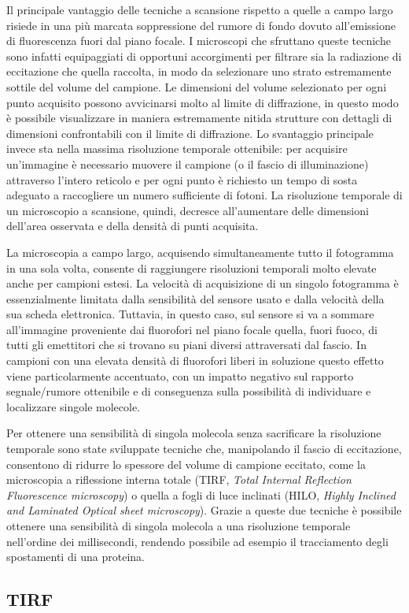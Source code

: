 Il principale vantaggio delle tecniche a scansione rispetto a quelle
a campo largo risiede in una più marcata soppressione del
rumore di fondo dovuto all'emissione di fluorescenza fuori dal
piano focale. I microscopi che sfruttano queste tecniche sono infatti
equipaggiati di opportuni accorgimenti per filtrare sia la radiazione
di eccitazione che quella raccolta, in modo da selezionare uno strato
estremamente sottile del volume del campione.
Le dimensioni del volume selezionato per ogni
punto acquisito possono avvicinarsi molto al limite di diffrazione,
in questo modo è possibile visualizzare in maniera estremamente nitida
strutture con dettagli di dimensioni confrontabili con il limite
di diffrazione.
Lo svantaggio principale invece sta nella massima risoluzione
temporale ottenibile: per acquisire un'immagine è necessario
muovere il campione (o il fascio di illuminazione) attraverso
l'intero reticolo e per ogni punto è richiesto un tempo di sosta
adeguato a raccogliere un numero sufficiente di fotoni.
La risoluzione temporale di un microscopio a scansione, quindi,
decresce all'aumentare delle dimensioni dell'area osservata e della
densità di punti acquisita.

La microscopia a campo largo, acquisendo simultaneamente tutto il
fotogramma in una sola volta, consente di raggiungere risoluzioni
temporali molto elevate anche per campioni estesi. La velocità
di acquisizione di un singolo fotogramma è essenzialmente limitata
dalla sensibilità del sensore usato e dalla velocità della sua scheda
elettronica.
Tuttavia, in questo caso, sul sensore si va a sommare all'immagine
proveniente dai fluorofori nel piano focale quella, fuori fuoco,
di tutti gli emettitori che si trovano su piani diversi attraversati
dal fascio.
In campioni con una elevata densità di fluorofori liberi in soluzione
questo effetto viene particolarmente accentuato, con un impatto
negativo sul rapporto segnale/rumore ottenibile e di conseguenza
sulla possibilità di individuare e localizzare singole molecole.

Per ottenere una sensibilità di singola molecola senza sacrificare
la risoluzione temporale sono state sviluppate tecniche che,
manipolando il fascio di eccitazione, consentono di ridurre lo
spessore del volume di campione eccitato, come la microscopia a
riflessione interna totale
(TIRF, \textit{Total Internal Reflection Fluorescence microscopy})
o quella a fogli di luce inclinati
(HILO, \textit{Highly Inclined and Laminated Optical sheet
microscopy}).
Grazie a queste due tecniche è possibile ottenere una sensibilità
di singola molecola a una risoluzione temporale nell'ordine dei
millisecondi, rendendo possibile ad esempio il tracciamento
degli spostamenti di una proteina.

\subsection{TIRF}


